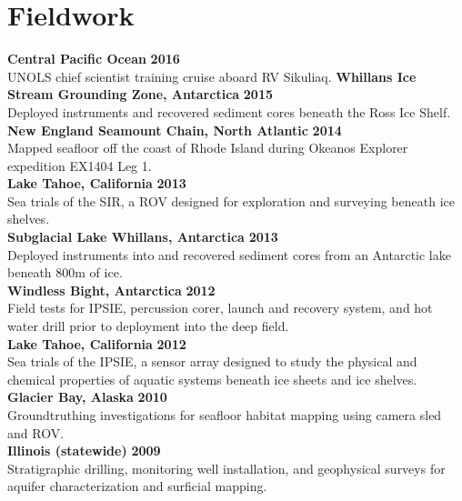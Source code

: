 \section{Fieldwork} 
\textbf{Central Pacific Ocean} \hfill \textbf{2016}\\
UNOLS chief scientist training cruise aboard RV Sikuliaq.
\vspace{2mm}
\textbf{Whillans Ice Stream Grounding Zone, Antarctica} \hfill \textbf{2015}\\
Deployed instruments and recovered sediment cores beneath the Ross Ice Shelf. \\
\vspace{2mm}
\textbf{New England Seamount Chain, North Atlantic} \hfill \textbf{2014}\\
Mapped seafloor off the coast of Rhode Island during Okeanos Explorer expedition EX1404 Leg 1. \\
\vspace{2mm}
\textbf{Lake Tahoe, California} \hfill \textbf{2013}\\
Sea trials of the SIR, a ROV designed for exploration and surveying beneath ice shelves. \\
\vspace{2mm}
\textbf{Subglacial Lake Whillans, Antarctica} \hfill \textbf{2013}\\
Deployed instruments into and recovered sediment cores from an Antarctic lake beneath 800m of ice.\\
\vspace{2mm}
\textbf{Windless Bight, Antarctica} \hfill \textbf{2012}\\
Field tests for IPSIE, percussion corer, launch and recovery system, and hot water drill prior to deployment into the deep field.\\
\vspace{2mm}
\textbf{Lake Tahoe, California} \hfill \textbf{2012}\\
Sea trials of the IPSIE, a sensor array designed to study the physical and chemical properties of aquatic systems beneath ice sheets and ice shelves. \\
\vspace{2mm}
\textbf{Glacier Bay, Alaska} \hfill \textbf{2010}\\
Groundtruthing investigations for seafloor habitat mapping using camera sled and ROV.\\
\vspace{2mm}
\textbf{Illinois (statewide)} \hfill \textbf{2009}\\
Stratigraphic drilling, monitoring well installation, and geophysical surveys for aquifer characterization and surficial mapping. \\
